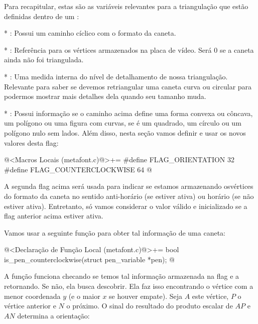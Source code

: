 {{{{{{Para recapitular, estas são as variáveis relevantes para a
triangulação que estão definidas dentro de um :

* : Possui um caminho
  cíclico com o formato da caneta.

* : Referência para os vértices armazenados
  na placa de vídeo. Será 0 se a caneta ainda não foi triangulada.

* : Uma medida interna do nível
  de detalhamento de nossa triangulação. Relevante para saber se devemos
  retriangular uma caneta curva ou circular para podermos mostrar mais
  detalhes dela quando seu tamanho muda.

* : Possui informação se o caminho acima define
  uma forma convexa ou côncava, um polígono ou uma figura com curvas,
  se é um quadrado, um círculo ou um polígono nulo sem lados. Além
  disso, nesta seção vamos definir e usar os novos valores desta flag:

\iniciocodigo
@<Macros Locais (metafont.c)@>+=
#define FLAG_ORIENTATION      32
#define FLAG_COUNTERCLOCKWISE 64
@
\fimcodigo

A segunda flag acima será usada para indicar se estamos armazenando
osvértices do formato da caneta no sentido anti-horário (se estiver
ativa) ou horário (se não estiver ativa). Entretanto, só vamos
considerar o valor válido e inicializado se a flag anterior acima
estiver ativa.

Vamos usar a seguinte função para obter tal informação de uma caneta:

\iniciocodigo
@<Declaração de Função Local (metafont.c)@>+=
bool is_pen_counterclockwise(struct pen_variable *pen);
@
\fimcodigo

A função funciona checando se temos tal informação armazenada na flag
e a retornando. Se não, ela busca descobrir. Ela faz isso encontrando
o vértice com a menor coordenada $y$ (e o maior $x$ se houver
empate). Seja $A$ este vértice, $P$ o vértice anterior e $N$ o
próximo. O sinal do resultado do produto escalar de $AP$ e $AN$
determina a orientação:

}}}}}}

